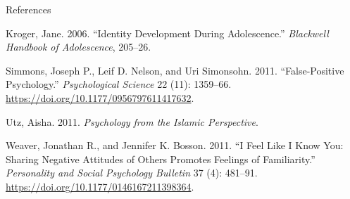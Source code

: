 \documentclass[
  ignorenonframetext,
  aspectratio=169,
]{beamer}
\newlength{\cslhangindent}
\newenvironment{CSLReferences}[2] %
 {\begin{list}{}{%
  \setlength{\itemindent}{0pt}
  \setlength{\leftmargin}{0pt}
  \setlength{\parsep}{0pt}
  \ifodd #1
   \setlength{\leftmargin}{\cslhangindent}
   \setlength{\itemindent}{-1\cslhangindent}
  \fi
  \setlength{\itemsep}{#2\baselineskip}}}
 {\end{list}}
\begin{document}
\begin{frame}{References}
\begin{CSLReferences}{1}{0}
Kroger, Jane. 2006. {``Identity Development During Adolescence.''}
\emph{Blackwell Handbook of Adolescence}, 205--26.

Simmons, Joseph P., Leif D. Nelson, and Uri Simonsohn. 2011.
{``False-Positive Psychology.''} \emph{Psychological Science} 22 (11):
1359--66. \url{https://doi.org/10.1177/0956797611417632}.

Utz, Aisha. 2011. \emph{Psychology from the Islamic Perspective}.

Weaver, Jonathan R., and Jennifer K. Bosson. 2011. {``I Feel Like I Know
You: Sharing Negative Attitudes of Others Promotes Feelings of
Familiarity.''} \emph{Personality and Social Psychology Bulletin} 37
(4): 481--91. \url{https://doi.org/10.1177/0146167211398364}.

\end{CSLReferences}
\end{frame}
\end{document}
